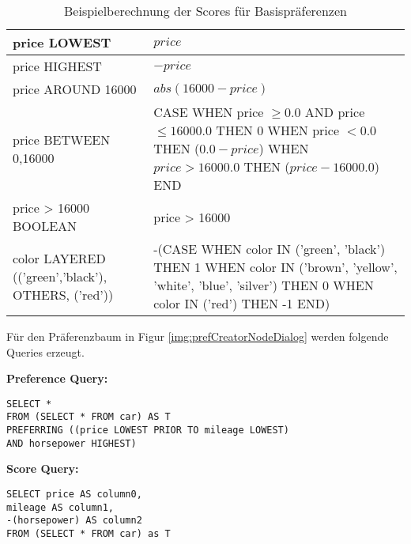 \begin{table}[H]
  \centering
  \begin{tabular}{|M{4cm}|M{10cm}|}
    \hline
    price LOWEST &  $price$ \\ \hline
    price HIGHEST & $-price$ \\ \hline
    price AROUND 16000 & $abs(16000-price)$ \\ \hline
    price BETWEEN 0,16000 & CASE WHEN price $\geq 0.0$ AND price $\leq 16000.0$ THEN $0$ WHEN price $< 0.0$ THEN ($0.0 - price$) WHEN $price > 16000.0$ THEN ($price-16000.0$) END \\ \hline
    price > 16000 BOOLEAN & price > 16000 \\ \hline
    color LAYERED (('green','black'), OTHERS, ('red')) & -(CASE WHEN color IN ('green', 'black') THEN 1 WHEN color IN ('brown', 'yellow', 'white', 'blue', 'silver') THEN 0 WHEN color IN ('red') THEN -1 END) \\ \hline
  \end{tabular}
  \newline\newline
  \caption{Beispielberechnung der Scores für Basispräferenzen}\label{tbl:scoreComputation}
\end{table}

Für den Präferenzbaum in Figur \ref{img:prefCreatorNodeDialog} werden folgende Queries erzeugt.

\textbf{Preference Query:}
\begin{verbatim}
SELECT * 
FROM (SELECT * FROM car) AS T 
PREFERRING ((price LOWEST PRIOR TO mileage LOWEST) 
AND horsepower HIGHEST)
\end{verbatim}

\textbf{Score Query:}
\begin{verbatim}
SELECT price AS column0,
mileage AS column1,
-(horsepower) AS column2 
FROM (SELECT * FROM car) as T
\end{verbatim}


